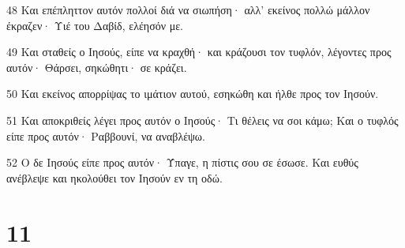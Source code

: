 \par 48 Και επέπληττον αυτόν πολλοί διά να σιωπήση· αλλ' εκείνος πολλώ μάλλον έκραζεν· Υιέ του Δαβίδ, ελέησόν με.
\par 49 Και σταθείς ο Ιησούς, είπε να κραχθή· και κράζουσι τον τυφλόν, λέγοντες προς αυτόν· Θάρσει, σηκώθητι· σε κράζει.
\par 50 Και εκείνος απορρίψας το ιμάτιον αυτού, εσηκώθη και ήλθε προς τον Ιησούν.
\par 51 Και αποκριθείς λέγει προς αυτόν ο Ιησούς· Τι θέλεις να σοι κάμω; Και ο τυφλός είπε προς αυτόν· Ραββουνί, να αναβλέψω.
\par 52 Ο δε Ιησούς είπε προς αυτόν· Ύπαγε, η πίστις σου σε έσωσε. Και ευθύς ανέβλεψε και ηκολούθει τον Ιησούν εν τη οδώ.

\chapter{11}

